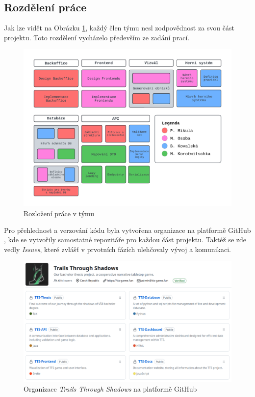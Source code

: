 \subsection{Rozdělení práce}\label{sec:collaboration:job_distribution}
Jak lze vidět na Obrázku \ref{fig:job_distribution}, každý člen týmu nesl zodpovědnost za svou část projektu. Toto rozdělení vycházelo především ze zadání prací. 

\begin{figure}[h]
    \centering
    \includegraphics[width=\textwidth]{../../shared/diagrams/blocks.pdf}
    \caption{Rozložení práce v týmu}
    \label{fig:job_distribution}
\end{figure}

Pro přehlednost a verzování kódu byla vytvořena organizace na platformě GitHub , kde se vytvořily samostatné repozitáře pro každou část projektu. Taktéž se zde vedly \textit{Issues}, které zvlášť v prvotních fázích ulehčovaly vývoj a komunikaci.

\begin{figure}[H]
    \centering
    \includegraphics[width=\textwidth]{../../shared/figures/gitOrg.png}
    \caption{Organizace \textit{Trails Through Shadows} na platformě GitHub}
    \label{fig:gitOrg}
\end{figure}

